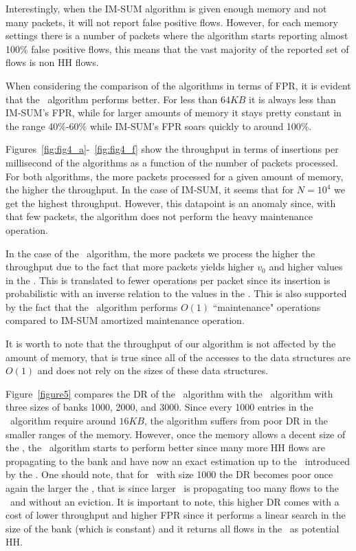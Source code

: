 Interestingly, when the IM-SUM algorithm is given enough memory and not many packets, it will not report false positive flows. However, for each memory settings there is a number of packets where the algorithm starts reporting almost 100\% false positive flows, this means that the vast majority of the reported set of flows is non HH flows.

When considering the comparison of the algorithms in terms of FPR, it is evident that the \cs\ algorithm performs better. For less than $64KB$ it is always less than IM-SUM's FPR, while for larger amounts of memory it stays pretty constant in the range 40\%-60\% while IM-SUM's FPR soars quickly to around 100\%.



Figures~\ref{fig:fig4_a}-~\ref{fig:fig4_f} show the throughput in terms of insertions per millisecond of the algorithms as a function of the number of packets processed. For both algorithms, the more packets processed for a given amount of memory, the higher the throughput. In the case of IM-SUM, it seems that for $N=10^4$ we get the highest throughput. However, this datapoint is an anomaly since, with that few packets, the algorithm does not perform the heavy maintenance operation.

In the case of the \cs\ algorithm, the more packets we process the higher the throughput due to the fact that more packets yields higher $v_0$ and higher values in the \sea. This is translated to fewer operations per packet since its insertion is probabilistic with an inverse relation to the values in the \sea. This is also supported by the fact that the \cs\ algorithm performs $O(1)$ ``maintenance" operations compared to IM-SUM amortized maintenance operation.

It is worth to note that the throughput of our algorithm is not affected by the amount of memory, that is true since all of the accesses to the data structures are $O(1)$ and does not rely on the sizes of these data structures.



Figure~\ref{figure5} compares the DR of the \cs\ algorithm with the \eb\ algorithm with three sizes of banks 1000, 2000, and 3000. Since every 1000 entries in the \eb\ algorithm require around $16KB$, the algorithm suffers from poor DR in the smaller ranges of the memory. However, once the memory allows a decent size of the \sfa, the \eb\ algorithm starts to perform better since many more HH flows are propagating to the bank and have now an exact estimation up to the \pe\ introduced by the \sfa. One should note, that for \eb\ with size 1000 the DR becomes poor once again the larger the \sfa, that is since larger \sfa\ is propagating too many flows to the \eb\ and without an eviction. It is important to note, this higher DR comes with a cost of lower throughput and higher FPR since it performs a linear search in the size of the bank (which is constant) and it returns all flows in the \eb\ as potential HH.